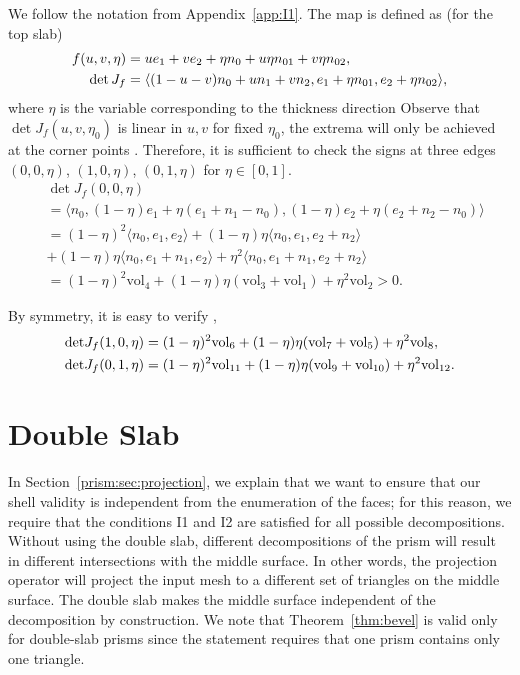 We follow the notation from {Appendix~\ref{app:I1}.} 
The map is defined as (for the top slab)
\begin{align*}
    f(u,v,\eta) &= u e_1 + v e_2  + \eta n_0 + u \eta n_{01} +
    v \eta n_{02},\\
    \det J_f &=  \langle (1-u-v) n_0 + u n_1 + v n_2, e_1 + \eta n_{01},
    e_2 + \eta n_{02} \rangle,
\end{align*}
where $\eta$ is the variable corresponding to the thickness direction
Observe that $\det J_f(u,v,\eta_0)$ is linear in $u,v$ for fixed $\eta_0$, the extrema will only be achieved at the corner points \cite{knabner2001invertibility}. Therefore, it is sufficient to check the signs at three edges
$(0,0,\eta)$, $(1,0,\eta)$, $(0,1,\eta)$ for $\eta \in [0,1]$.
\begin{align*}
    & \det J_f(0,0,\eta) \\
    &= \langle n_0, (1-\eta)e_1 +\eta (e_1 + n_1 - n_0),(1-\eta)e_2 +\eta (e_2 + n_2 - n_0) \rangle \\
    &= (1-\eta)^2\langle n_0, e_1, e_2 \rangle + 
    (1-\eta)\eta \langle n_0,e_1, e_2+n_2\rangle \\&+ 
    (1-\eta)\eta \langle n_0, e_1+n_1, e_2\rangle + 
    \eta^2\langle n_0, e_1+n_1, e_2 + n_2\rangle\\
    &= (1-\eta)^2 \text{vol}_4 + (1-\eta)\eta (\text{vol}_3 +\text{vol}_1) + \eta^2 \text{vol}_2 > 0.
\end{align*}

By symmetry, 
it is easy to verify ,
\begin{align*}
    \det& J_f(1,0,\eta) = (1-\eta)^2 \text{vol}_6 + (1-\eta)\eta (\text{vol}_7 +\text{vol}_5) + \eta^2 \text{vol}_8, \\
    \det& J_f(0,1,\eta) = (1-\eta)^2 \text{vol}_{11} + (1-\eta)\eta (\text{vol}_9 +\text{vol}_{10}) + \eta^2 \text{vol}_{12}.\\
\end{align*}


\section{Double Slab}\label{app:dblayer}
In Section~\ref{prism:sec:projection}, we explain that we want to ensure that our shell validity is independent from the enumeration of the faces; for this reason, we require that the conditions I1 and I2 are satisfied for all possible decompositions. Without using the double slab, different decompositions of the prism will result in  different intersections with the middle surface. In other words, the projection operator will project the input mesh to a different set of triangles on the middle surface. 
The double slab makes the middle surface independent of the decomposition by construction. 
We note that Theorem~\ref{thm:bevel} is valid only for double-slab prisms since the statement requires that one prism contains only one triangle.

